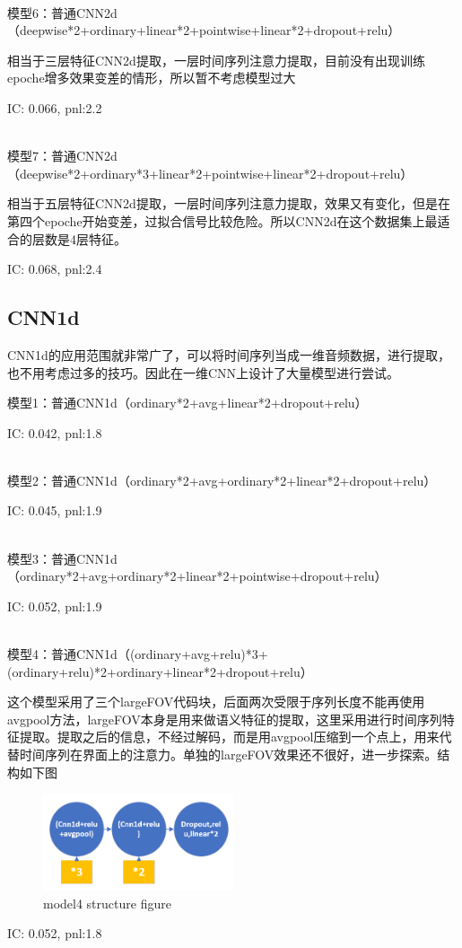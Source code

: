 \documentclass[11pt]{ctexart}
\begin{document}
~\\
模型6：普通CNN2d（deepwise*2+ordinary+linear*2+pointwise+linear*2+dropout+relu）

相当于三层特征CNN2d提取，一层时间序列注意力提取，目前没有出现训练epoche增多效果变差的情形，所以暂不考虑模型过大

{\kaishu \small IC: 0.066, pnl:2.2}

~\\
模型7：普通CNN2d（deepwise*2+ordinary*3+linear*2+pointwise+linear*2+dropout+relu）

相当于五层特征CNN2d提取，一层时间序列注意力提取，效果又有变化，但是在第四个epoche开始变差，过拟合信号比较危险。所以CNN2d在这个数据集上最适合的层数是4层特征。

{\kaishu \small IC: 0.068, pnl:2.4}

\subsection{CNN1d}
CNN1d的应用范围就非常广了，可以将时间序列当成一维音频数据，进行提取，也不用考虑过多的技巧。因此在一维CNN上设计了大量模型进行尝试。

模型1：普通CNN1d（ordinary*2+avg+linear*2+dropout+relu）

{\kaishu \small IC: 0.042, pnl:1.8}

~\\
模型2：普通CNN1d（ordinary*2+avg+ordinary*2+linear*2+dropout+relu）

{\kaishu \small IC: 0.045, pnl:1.9}

~\\
模型3：普通CNN1d（ordinary*2+avg+ordinary*2+linear*2+pointwise+dropout+relu）

{\kaishu \small IC: 0.052, pnl:1.9}

~\\
模型4：普通CNN1d（(ordinary+avg+relu)*3+(ordinary+relu)*2+ordinary+linear*2+dropout+relu）

这个模型采用了三个largeFOV代码块，后面两次受限于序列长度不能再使用avgpool方法，largeFOV本身是用来做语义特征的提取，这里采用进行时间序列特征提取。提取之后的信息，不经过解码，而是用avgpool压缩到一个点上，用来代替时间序列在界面上的注意力。单独的largeFOV效果还不很好，进一步探索。结构如下图

\begin{figure}[H]
\begin{center}
\includegraphics[width=0.5\textwidth]{str1.PNG}
\end{center}
\caption{model4 structure figure}
\label{FIG.1}
\end{figure}
{\kaishu \small IC: 0.052, pnl:1.8}
\end{document}
